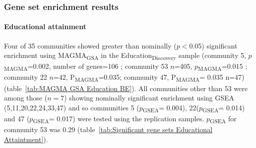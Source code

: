 \subsubsection{Gene set enrichment results}

\paragraph{Educational attainment}
Four of 35 communities showed greater than nominally ($p<$0.05) significant enrichment using MAGMA\textsubscript{GSA} in the Education\textsubscript{Discovery} sample (community 5, $p$\textsubscript{MAGMA}=0.002, number of genes=106 ; community 53 $n$=405, $p$\textsubscript{MAGMA}=0.015 ; community 22 $n$=42, P\textsubscript{MAGMA}=0.035; community 47, P\textsubscript{MAGMA}= 0.035 n=47) (table~\ref{tab:MAGMA GSA Education  BE}). All communities other than 53 were among those ($n=7$) showing nominally significant enrichment using GSEA (5,11,20,22,24,33,47) and so communities 5 ($p$\textsubscript{GSEA}= 0.004), 22($p$\textsubscript{GSEA}= 0.014) and 47 ($p$\textsubscript{GSEA}= 0.017) were tested using the replication samples. $p$\textsubscript{GSEA} for community 53 was 0.29 (table~\ref{tab:Significant gene sets Educational Attaintment}). 


